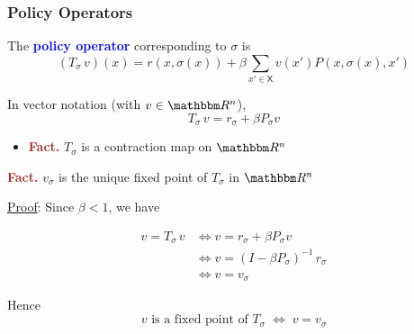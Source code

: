 \documentclass[xcolor=dvipsnames]{beamer}
\newcommand{\navy}[1]{\textcolor{Blue}{\bf #1}}
\newcommand{\Fact}{\textcolor{Brown}{\bf Fact. }}
\newcommand{\RR}{\mathbbm R}
\newcommand{\Xsf}{\mathsf X}
\newcommand{\1}{\mathbbm 1}
\begin{document}
\begin{frame}
    \frametitle{Policy Operators}

   The \navy{policy operator} corresponding to $\sigma$ is
    \begin{equation*}
        (T_\sigma \, v)(x)
        =
            r(x, \sigma(x))
            + \beta
            \sum_{x' \in \Xsf} v(x') P(x, \sigma(x), x')
    \end{equation*}



    \vspace{0.5em}
    In vector notation (with $v \in \RR^n$),
    \begin{equation*}
        T_\sigma \, v 
        = r_\sigma + \beta P_\sigma v
    \end{equation*}

    \vspace{0.5em}
    \vspace{0.5em}

    \begin{itemize}
        \item \Fact $T_\sigma$ is a contraction map on $\RR^n$
    \end{itemize}

\end{frame}



\begin{frame}
    
    \Fact $v_\sigma$ is the unique fixed
    point of $T_\sigma$ in $\RR^n$ 

    \pause
    \vspace{0.5em}
    \vspace{0.5em}
    \underline{Proof}: Since $\beta < 1$, we have

    \begin{align*}
        v = T_\sigma \, v
        & \iff v = r_\sigma + \beta P_\sigma v
        \\
        & \iff v = (I - \beta P_\sigma)^{-1} \, r_\sigma 
        \\
        & \iff v = v_\sigma
    \end{align*}

    \vspace{0.5em}
    Hence 
    $$v \text{ is a fixed point of } T_\sigma \; \iff \; v = v_\sigma $$

\end{frame}
\end{document}
